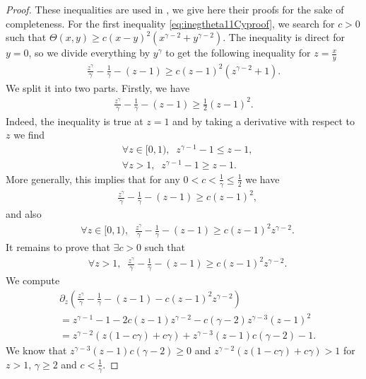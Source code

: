 \documentclass[a4paper, 15pt]{article}
\numberwithin{equation}{section}
\begin{document}
\begin{proof}
    These inequalities are used in \cite{zbMATH06101438}, we give here their proofs for the sake of completeness. For the first inequality \eqref{eq:inegtheta11Cyproof}, we search for $c>0$ such that $\Theta(x,y)\geq c(x-y)^2(x^{\gamma-2}+y^{\gamma-2})$.  The inequality is direct for $y=0$, so we divide everything by $y^\gamma$ to get the following inequality for $z=\frac{x}{y}$ 
    \begin{align*}
       \frac{z^\gamma}{\gamma}-\frac{1}{\gamma}-(z-1)\geq c(z-1)^2(z^{\gamma-2}+1).
    \end{align*}
   We split it into two parts. Firstly, we have
    \begin{align}
    \label{eq:inegz1Cyproof}
       \frac{z^\gamma}{\gamma}-\frac{1}{\gamma}-(z-1)\geq \frac{1}{2}(z-1)^2.
    \end{align}
   Indeed, the inequality is true at $z=1$ and by taking a derivative with respect to $z$ we find
    \begin{align*}
      &\forall z\in[0,1),\;\; z^{\gamma-1}-1\leq z-1, \\
      &\forall z>1,\;\;  z^{\gamma-1}-1\geq z-1.
    \end{align*}
   More generally, this implies that for any $0<c<\frac{1}{\gamma}\leq\frac{1}{2}$ we have 
     \begin{align}
     \label{eq:inegz2Cyproof}
       &\frac{z^\gamma}{\gamma}-\frac{1}{\gamma}-(z-1)\geq c(z-1)^2,
    \end{align}
    and also
     \begin{align*}
       &\forall z\in[0,1),\;\;\frac{z^\gamma}{\gamma}-\frac{1}{\gamma}-(z-1)\geq c(z-1)^2z^{\gamma-2}.
       \end{align*}
       It remains to prove that $\exists c>0$ such that
           \begin{align*}
       &\forall z>1,\;\;\frac{z^\gamma}{\gamma}-\frac{1}{\gamma}-(z-1)\geq c(z-1)^2z^{\gamma-2}.
       \end{align*}
    We compute 
    \begin{align*}
    &\partial_z(\frac{z^\gamma}{\gamma}-\frac{1}{\gamma}-(z-1)-c(z-1)^2z^{\gamma-2})\\
        &=z^{\gamma-1}-1-2c(z-1)z^{\gamma-2}-c(\gamma-2)z^{\gamma-3}(z-1)^2\\
        &=z^{\gamma-2}(z(1-c\gamma)+c\gamma)+z^{\gamma-3}(z-1)c(\gamma-2)-1.
    \end{align*}
  We know that $z^{\gamma-3}(z-1)c(\gamma-2)\geq0$ and $z^{\gamma-2}(z(1-c\gamma)+c\gamma)>1$ for $z>1$, $\gamma\geq2$ and $c<\frac{1}{\gamma}$.

\end{proof}
\end{document}
